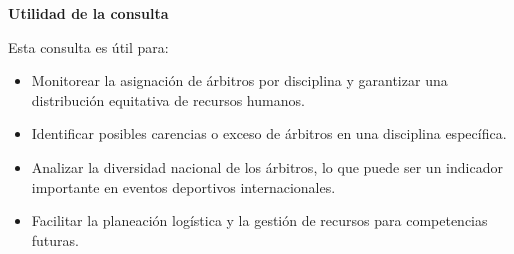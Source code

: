 \textbf{Utilidad de la consulta}

Esta consulta es útil para:
\begin{itemize}
    \item Monitorear la asignación de árbitros por disciplina y garantizar una distribución equitativa de recursos humanos.
    \item Identificar posibles carencias o exceso de árbitros en una disciplina específica.
    \item Analizar la diversidad nacional de los árbitros, lo que puede ser un indicador importante en eventos deportivos internacionales.
    \item Facilitar la planeación logística y la gestión de recursos para competencias futuras.
\end{itemize}